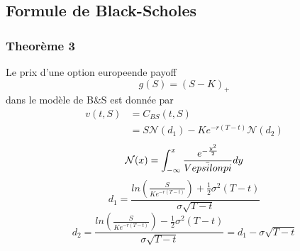 \documentclass{article}
\begin{document}
\subsection{Formule de Black-Scholes}
\subsubsection{Theor\`eme 3}
Le prix d'une option europeende payoff
\begin{equation}
g(S)=(S-K)_+
\end{equation}
dans le mod\`ele de B\&S est donn\'ee par
\begin{equation}
\begin{split}
v(t,S)&=C_{BS}(t,S)\\
&=S\mathcal{N}(d_1)-K e^{-r(T-t)}\mathcal{N}(d_2)
\end{split}
\end{equation}
\begin{equation}
\mathcal{N}(x)=\int_{-\infty}^x \frac{e^{-\frac{y^2}{2}}}{V\bar{epsilon}\\pi}dy
\end{equation}
\begin{equation}
d_1=\frac{ln(\frac{S}{Ke^{-r(T-t)}})+\frac{1}{2}\sigma^2(T-t)}{\sigma \sqrt{T-t}}
\end{equation}
\begin{equation}
d_2=\frac{ln(\frac{S}{Ke^{-r(T-t)}})-\frac{1}{2}\sigma^2(T-t)}{\sigma\sqrt{T-t}}=d_1-\sigma\sqrt{T-t}
\end{equation}
\end{document}
